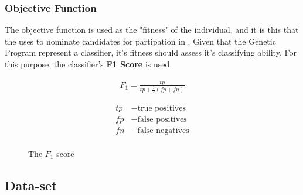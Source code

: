\documentclass[a4paper,12pt]{article}
\begin{document}
        \subsubsection*{Objective Function} \label{subsubsec:objectivefunction}
            \par{
                \noindent The objective function is used as the "fitness" of the individual, and it is this that the  uses to nominate candidates 
                for partipation in . \newline 
                \newline 
                Given that the Genetic Program represent a classifier, it's fitness should assess it's classifying ability. For this purpose, the classifier's \textbf{F1 Score} \cite{f1score} is used.
                \begin{figure}[h!]
                    \begin{minipage}[c]{0.5\textwidth}
                        \begin{align*} 
                            \nonumber F_{1} =  \frac{tp}{tp + \frac{1}{2}(fp + fn)}
                        \end{align*}
                    \end{minipage}
                    \begin{minipage}[c]{0.5\textwidth}
                        \begin{align*} 
                            \nonumber tp &- \text{true positives} \\
                            \nonumber fp &- \text{false positives} \\
                            \nonumber fn &- \text{false negatives} \\
                        \end{align*}
                    \end{minipage}
                    \caption{The $F_1$ score}
                \end{figure} 
            }
    \subsection{Data-set}
            
\end{document}
